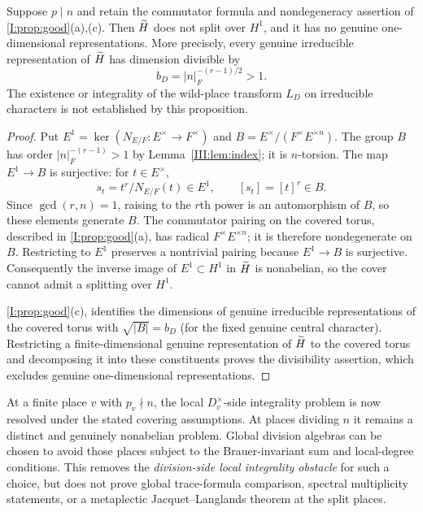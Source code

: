\begin{proposition}\label{III:prop:wild-obstruction}
Suppose $p\mid n$ and retain the commutator formula and
nondegeneracy assertion of \cref{I:prop:good}(a),(c).
Then $\widetilde H$ does not split over $H^1$, and it has no genuine
one-dimensional representations. More precisely, every genuine irreducible
representation of $\widetilde H$ has dimension divisible by
\[
 b_D=|n|_F^{-(r-1)/2}>1.
\]
The existence or integrality of the wild-place transform $L_D$
on irreducible characters is not established by this proposition.
\end{proposition}
\begin{proof}
Put $E^1=\ker(N_{E/F}:E^\times\to F^\times)$ and
$B=E^\times/(F^\times E^{\times n})$. The group $B$ has
order $|n|_F^{-(r-1)}>1$ by Lemma~\ref{III:lem:index}; it is
$n$-torsion. The map $E^1\to B$ is surjective: for $t\in E^\times$,
\[
 s_t=t^r/N_{E/F}(t)\in E^1,
\qquad [s_t]=[t]^r\in B.
\]
Since $\gcd(r,n)=1$, raising to the $r$th power is an
automorphism of $B$, so these elements generate $B$.
The commutator pairing on the covered torus, described in
\cref{I:prop:good}(a), has radical
$F^\times E^{\times n}$; it is therefore nondegenerate on
$B$. Restricting to $E^1$ preserves a nontrivial pairing
because $E^1\to B$ is surjective. Consequently the
inverse image of $E^1\subset H^1$ in $\widetilde H$ is nonabelian,
so the cover cannot admit a splitting over $H^1$.

\cref{I:prop:good}(c), identifies the dimensions of
genuine irreducible representations of the covered torus
with $\sqrt{|B|}=b_D$ (for the fixed genuine central
character). Restricting a finite-dimensional genuine
representation of $\widetilde H$ to the covered torus and decomposing
it into these constituents proves the divisibility assertion,
which excludes genuine one-dimensional representations.
\end{proof}

\begin{remark}\label{III:rem:global-tame}
At a finite place $v$ with $p_v\nmid n$, the local
$D_v^\times$-side integrality problem is now resolved under
the stated covering assumptions. At places dividing $n$
it remains a distinct and genuinely nonabelian problem.
Global division algebras can be chosen to avoid those places
subject to the Brauer-invariant sum and local-degree
conditions. This removes the \emph{division-side local
integrality obstacle} for such a choice, but does not prove
global trace-formula comparison, spectral multiplicity
statements, or a metaplectic Jacquet--Langlands theorem
at the split places.
\end{remark}

